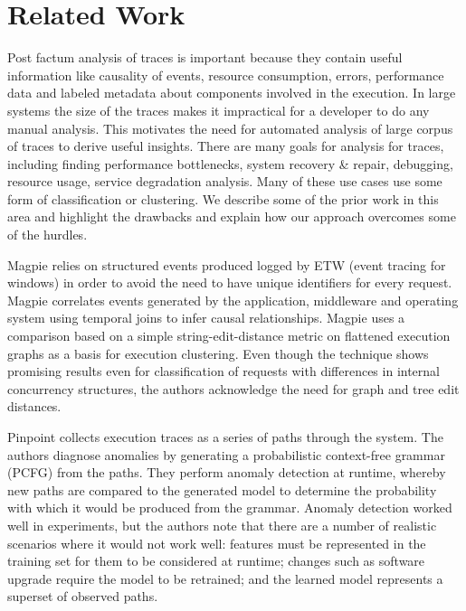 \section{Related Work}

Post factum analysis of traces is important because they contain useful information like causality of events, resource consumption, errors, performance data and labeled metadata about components involved in the execution.
In large systems the size of the traces makes it impractical for a developer to do any manual analysis. This motivates the need for automated analysis of large corpus of traces to derive useful insights.
There are many goals for analysis for traces, including finding performance bottlenecks, system recovery \& repair, debugging, resource usage, service degradation analysis.
Many of these use cases use some form of classification or clustering. We describe some of the prior work in this area and highlight the drawbacks and explain how our approach overcomes some of the hurdles.

Magpie \cite{Barham:2003:MOM:1251054.1251069} relies on structured events produced logged by ETW (event tracing for windows) in order to avoid the need to have unique identifiers for every request.
Magpie correlates events generated by the application, middleware and operating system using temporal joins to infer causal relationships. 
Magpie uses a comparison based on a simple string-edit-distance metric on flattened execution graphs as a basis for execution clustering.
Even though the technique shows promising results even for classification of requests with differences in internal concurrency structures, the authors acknowledge the need for graph and tree edit distances.

Pinpoint \cite{Chen:2004:PFE:1251175.1251198} collects execution traces as a series of paths through the system. The authors diagnose anomalies by generating a probabilistic context-free grammar (PCFG) from the paths. 
They perform anomaly detection at runtime, whereby new paths are compared to the generated model to determine the probability with which it would be produced from the grammar. 
Anomaly detection worked well in experiments, but the authors note that there are a number of realistic scenarios where it would
not work well: features must be represented in the training set for them to be considered at runtime; changes
such as software upgrade require the model to be retrained; and the learned model represents a superset of observed paths.

